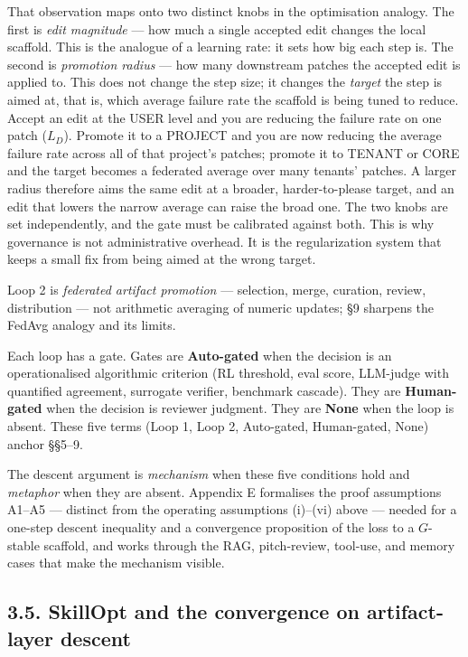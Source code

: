 That observation maps onto two distinct knobs in the optimisation
analogy. The
first is \emph{edit magnitude} --- how much a single accepted edit
changes the local scaffold. This is the analogue of a learning rate: it
sets how big each step is. The second is \emph{promotion radius} --- how
many downstream patches the accepted edit is applied to. This does not
change the step size; it changes the \emph{target} the step is aimed at,
that is, which average failure rate the scaffold is being tuned to
reduce. Accept an edit at the USER level and you are reducing the
failure rate on one patch (\(L_D\)). Promote it to a PROJECT and you are
now reducing the average failure rate across all of that project's
patches; promote it to TENANT or CORE and the target becomes a federated
average over many tenants' patches. A larger radius therefore aims the
same edit at a broader, harder-to-please target, and an edit that lowers
the narrow average can raise the broad one. The two knobs are set
independently, and the gate must be calibrated against both. This is why
governance is not administrative overhead. It is the regularization
system that keeps a small fix from being aimed at the wrong target.

Loop 2 is \emph{federated artifact promotion} --- selection, merge,
curation, review, distribution --- not arithmetic averaging of numeric
updates; §9 sharpens the FedAvg analogy and its limits.

Each loop has a gate. Gates are \textbf{Auto-gated} when the decision is
an operationalised algorithmic criterion (RL threshold, eval score,
LLM-judge with quantified agreement, surrogate verifier, benchmark
cascade). They are \textbf{Human-gated} when the decision is reviewer
judgment. They are \textbf{None} when the loop is absent. These five
terms (Loop 1, Loop 2, Auto-gated, Human-gated, None) anchor §§5--9.

The descent argument is \emph{mechanism} when these five conditions hold
and \emph{metaphor} when they are absent. Appendix E formalises the
proof assumptions A1--A5 --- distinct from the operating assumptions
(i)--(vi) above --- needed for a one-step descent inequality and a
convergence proposition of the loss to a \(G\)-stable scaffold, and
works through the RAG, pitch-review, tool-use, and memory cases that
make the mechanism visible.

\subsection{3.5. SkillOpt and the convergence on artifact-layer
descent}\label{skillopt-and-the-convergence-on-artifact-layer-descent}

